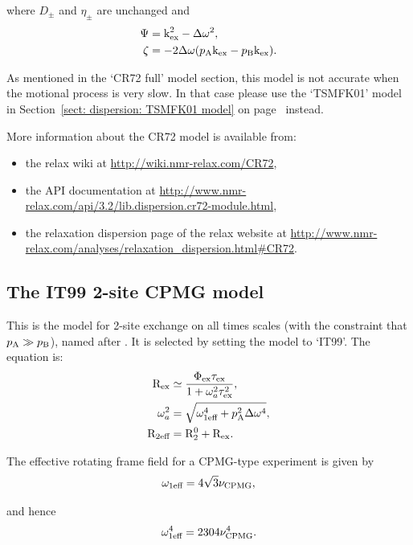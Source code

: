 where $D_{\pm}$ and $\eta_{\pm}$ are unchanged and
\begin{align}
    \Psi  &= \textrm{k}_{\textrm{ex}}^2 - \Delta\omega^2 , \\
    \zeta &= -2\Delta\omega (p_{\textrm{A}}\textrm{k}_{\textrm{ex}} - p_{\textrm{B}}\textrm{k}_{\textrm{ex}}) .
\end{align}

As mentioned in the `CR72 full' model section, this model is not accurate when the motional process is very slow.
In that case please use the `TSMFK01' model in Section~\ref{sect: dispersion: TSMFK01 model} on page~\pageref{sect: dispersion: TSMFK01 model} instead.

More information about the CR72 model is available from:
\begin{itemize}
  \item the relax wiki at \url{http://wiki.nmr-relax.com/CR72},
  \item the API documentation at \url{http://www.nmr-relax.com/api/3.2/lib.dispersion.cr72-module.html},
  \item the relaxation dispersion page of the relax website at \url{http://www.nmr-relax.com/analyses/relaxation\_dispersion.html#CR72}.
\end{itemize}



\subsection{The IT99 2-site CPMG model}
\label{sect: dispersion: IT99 model}

This is the model for 2-site exchange on all times scales (with the constraint that $p_{\textrm{A}} \gg p_{\textrm{B}}$), named after \citet{IshimaTorchia99}.
It is selected by setting the model to `IT99'.
The equation is:
\begin{align}
    \mathrm{R}_{\textrm{ex}}       &\simeq \frac{\Phi_{\textrm{ex}}\tau_{\textrm{ex}}}{1 + \omega_a^2\tau_{\textrm{ex}}^2} , \\
    \omega_a^2 &= \sqrt{\omega_{\textrm{1eff}}^4 + p_{\textrm{A}}^2\Delta\omega^4} , \\
    \mathrm{R}_{\textrm{2eff}}   &= \mathrm{R}_2^0 + \mathrm{R}_{\textrm{ex}} .
\end{align}

The effective rotating frame field for a CPMG-type experiment is given by
\begin{equation}
    \omega_{\textrm{1eff}} = 4\sqrt{3}\nu_{\textrm{CPMG}} ,
\end{equation}

and hence
\begin{equation}
    \omega_{\textrm{1eff}}^4 = 2304\nu_{\textrm{CPMG}}^4 .
\end{equation}

